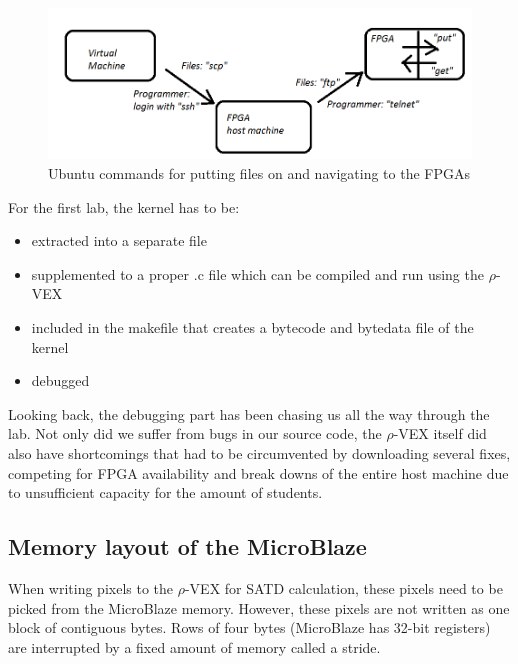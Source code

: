 \begin{figure}[htb]%
\includegraphics[width=\columnwidth]{Pictures/hop}%
\caption{Ubuntu commands for putting files on and navigating to the FPGAs}%
\label{fig:hoppen}%
\end{figure}

For the first lab, the  kernel has to be:
\begin{itemize}
	\item extracted into a separate file
	\item supplemented to a proper .c file which can be compiled and run using the $\rho$-VEX
	\item included in the makefile that creates a bytecode and bytedata file of the kernel
	\item debugged
\end{itemize}

Looking back, the debugging part has been chasing us all the way through the lab. Not only did we suffer from bugs in our source code, the $\rho$-VEX itself did also have shortcomings that had to be circumvented by downloading several fixes, competing for FPGA availability and break downs of the entire host machine due to unsufficient capacity for the amount of students.

\subsection{Memory layout of the MicroBlaze}

When writing pixels to the $\rho$-VEX for SATD calculation, these pixels need to be picked from the MicroBlaze memory. However, these pixels are not written as one block of contiguous bytes. Rows of four bytes (MicroBlaze has 32-bit registers) are interrupted by a fixed amount of memory called a stride.

